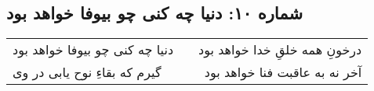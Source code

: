 \begin{center}
\section*{شماره ۱۰: دنیا چه کنی چو بیوفا خواهد بود}
\label{sec:010}
\begin{longtable}{l p{0.5cm} r}
دنیا چه کنی چو بیوفا خواهد بود
&&
درخونِ همه خلقِ خدا خواهد بود
\\
گیرم که بقاءِ نوح یابی در وی
&&
آخر نه به عاقبت فنا خواهد بود
\\
\end{longtable}
\end{center}
